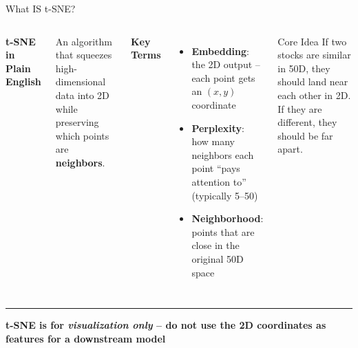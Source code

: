 \documentclass[8pt,aspectratio=169]{beamer}
\newcommand{\bottomnote}[1]{%
\vfill
\vspace{-2mm}
\textcolor{mllavender2}{\rule{\textwidth}{0.4pt}}
\vspace{1mm}
\footnotesize
\textbf{#1}
}
\newenvironment{compactlist}{%
  \begin{itemize}%
    \setlength{\itemsep}{2pt}%
    \setlength{\parskip}{0pt}%
    \setlength{\parsep}{0pt}%
}{%
  \end{itemize}%
}
\newcommand{\highlight}[1]{\textcolor{mlorange}{\textbf{#1}}}
\begin{document}
\begin{frame}[t]{What IS t-SNE?}
\begin{columns}[T]
\small
\textbf{t-SNE in Plain English}

An algorithm that squeezes high-dimensional data into 2D while preserving which points are \highlight{neighbors}.

\vspace{3mm}
\textbf{Key Terms}
\begin{compactlist}
\item \highlight{Embedding}: the 2D output -- each point gets an $(x,y)$ coordinate
\item \highlight{Perplexity}: how many neighbors each point ``pays attention to'' (typically 5--50)
\item \highlight{Neighborhood}: points that are close in the original 50D space
\end{compactlist}

\begin{block}{Core Idea}
\scriptsize If two stocks are similar in 50D, they should land near each other in 2D. If they are different, they should be far apart.
\end{block}

\vspace{2mm}
\footnotesize
{}
\end{columns}

\bottomnote{t-SNE is for \emph{visualization only} -- do not use the 2D coordinates as features for a downstream model}
\end{frame}
\end{document}
